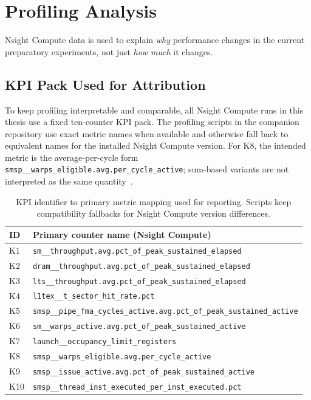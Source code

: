 \section{Profiling Analysis}\label{sec:profiling}

Nsight Compute data is used to explain \emph{why} performance changes in the
current preparatory experiments, not just \emph{how much} it changes.

\subsection{KPI Pack Used for Attribution}

To keep profiling interpretable and comparable, all Nsight Compute runs in this
thesis use a fixed ten-counter KPI pack. The profiling scripts in the companion
repository use exact metric names when available and otherwise fall back to
equivalent names for the installed Nsight Compute version. For K8, the intended
metric is the average-per-cycle form
\texttt{smsp\_\_warps\_eligible.avg.per\_cycle\_active}; sum-based variants are
not interpreted as the same quantity~\cite{nvidia-nsight-compute-cli}.

\begin{table}[t]
  \centering
  \small
  \begin{tabularx}{\textwidth}{l X}
    \toprule
    ID & Primary counter name (Nsight Compute) \\
    \midrule
    K1 & \texttt{sm\_\_throughput.avg.pct\_of\_peak\_sustained\_elapsed} \\
    K2 & \texttt{dram\_\_throughput.avg.pct\_of\_peak\_sustained\_elapsed} \\
    K3 & \texttt{lts\_\_throughput.avg.pct\_of\_peak\_sustained\_elapsed} \\
    K4 & \texttt{l1tex\_\_t\_sector\_hit\_rate.pct} \\
    K5 & \texttt{smsp\_\_pipe\_fma\_cycles\_active.avg.pct\_of\_peak\_sustained\_active} \\
    K6 & \texttt{sm\_\_warps\_active.avg.pct\_of\_peak\_sustained\_active} \\
    K7 & \texttt{launch\_\_occupancy\_limit\_registers} \\
    K8 & \texttt{smsp\_\_warps\_eligible.avg.per\_cycle\_active} \\
    K9 & \texttt{smsp\_\_issue\_active.avg.pct\_of\_peak\_sustained\_active} \\
    K10 & \texttt{smsp\_\_thread\_inst\_executed\_per\_inst\_executed.pct} \\
    \bottomrule
  \end{tabularx}
  \caption{KPI identifier to primary metric mapping used for reporting. Scripts
  keep compatibility fallbacks for Nsight Compute version differences.}
  \label{tab:kpi-pack}
\end{table}

